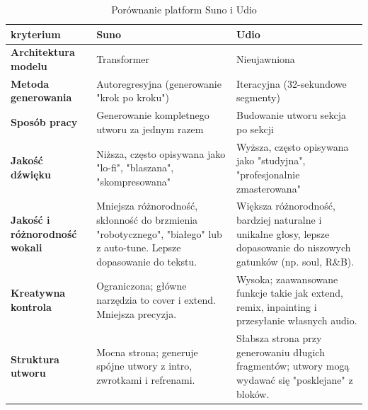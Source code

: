 \begin{table}
\caption{Porównanie platform Suno i Udio}
\label{tab:compareSA}
\begin{tabular}{p{59pt}p{129pt}p{129pt}}
\hline
kryterium                             & Suno                                                                                                                   & Udio                                                                                                                  \\ \hline
\textbf{Architektura modelu}          & Transformer                                                                                                            & Nieujawniona                                                                                                         \\ \hline
\textbf{Metoda generowania}      & Autoregresyjna (generowanie "krok po kroku")                                                                           & Iteracyjna (32-sekundowe segmenty)                                                                  \\ \hline
\textbf{Sposób pracy}                 & Generowanie kompletnego utworu za jednym razem                                                                         & Budowanie utworu sekcja po sekcji                                                                                     \\ \hline
\textbf{Jakość dźwięku}               & Niższa, często opisywana jako "lo-fi", "blaszana", "skompresowana"                                                     & Wyższa, często opisywana jako "studyjna", "profesjonalnie zmasterowana"                                               \\ \hline
\textbf{Jakość i różnorodność wokali} & Mniejsza różnorodność, skłonność do brzmienia "robotycznego", "białego" lub z auto-tune. Lepsze dopasowanie do tekstu. & Większa różnorodność, bardziej naturalne i unikalne głosy, lepsze dopasowanie do niszowych gatunków (np. soul, R\&B). \\ \hline
\textbf{Kreatywna kontrola}           & Ograniczona; główne narzędzia to cover i extend. Mniejsza precyzja.                                                    & Wysoka; zaawansowane funkcje takie jak extend, remix, inpainting i przesyłanie własnych audio.                        \\ \hline
\textbf{Struktura utworu}             & Mocna strona; generuje spójne utwory z intro, zwrotkami i refrenami.                                                   & Słabsza strona przy generowaniu długich fragmentów; utwory mogą wydawać się "posklejane" z bloków.                    \\ \hline

\end{tabular}
\end{table}
